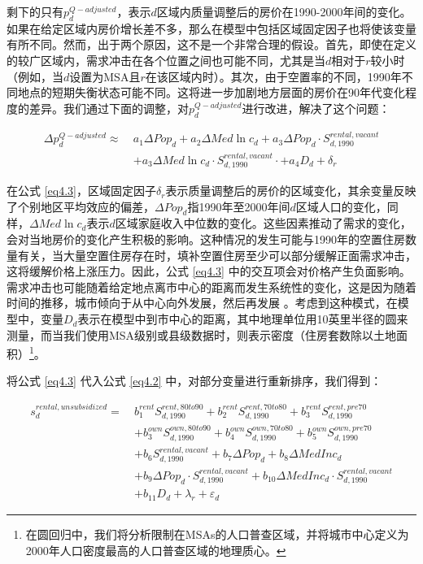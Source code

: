 \documentclass[lang=cn,11pt,a4paper]{paper}
\begin{document}
剩下的只有$p_{d}^{Q-adjusted}$，表示$d$区域内质量调整后的房价在1990-2000年间的变化。如果在给定区域内房价增长差不多，那么在模型中包括区域固定因子也将使该变量有所不同。然而，出于两个原因，这不是一个非常合理的假设。首先，即使在定义的较广区域内，需求冲击在各个位置之间也可能不同，尤其是当$d$相对于$r$较小时（例如，当$d$设置为MSA且$r$在该区域内时）。其次，由于空置率的不同，1990年不同地点的短期失衡状态可能不同。这将进一步加剧地方层面的房价在90年代变化程度的差异。我们通过下面的调整，对$p_{d}^{Q-adjusted}$进行改进，解决了这个问题：

\begin{equation}\label{eq4.3}
  \begin{aligned}
    \Delta p_{d}^{Q-adjusted} \approx \ & a_{1} \Delta Pop_{d}+a_{2} \Delta Med \ln c_{d}+a_{3} \Delta P o p_{d} \cdot S_{d, 1990}^{rental,vacant} \\
    &+a_{3} \Delta M e d \ln c_{d} \cdot S_{d, 1990}^{rental,vacant} \cdot+a_{4} D_{d}+\delta_{r}
    \end{aligned}
\end{equation}
\vspace{2pt}

在公式 \eqref{eq4.3}，区域固定因子$\delta_{r}$表示质量调整后的房价的区域变化，其余变量反映了个别地区平均效应的偏差，$\Delta Pop_{d}$指1990年至2000年间$d$区域人口的变化，同样，$\Delta Med \ln c_{d}$表示$d$区域家庭收入中位数的变化。这些因素推动了需求的变化，会对当地房价的变化产生积极的影响。这种情况的发生可能与1990年的空置住房数量有关，当大量空置住房存在时，填补空置住房至少可以部分缓解正面需求冲击，这将缓解价格上涨压力。因此，公式 \eqref{eq4.3} 中的交互项会对价格产生负面影响。需求冲击也可能随着给定地点离市中心的距离而发生系统性的变化，这是因为随着时间的推移，城市倾向于从中心向外发展，然后再发展 \citep{Brueckner2009725}。考虑到这种模式，在模型中，变量$D_d$表示在模型中到市中心的距离，其中地理单位用10英里半径的圆来测量，而当我们使用MSA级别或县级数据时，则表示密度（住房套数除以土地面积）\!\footnote{在圆回归中，我们将分析限制在MSAs的人口普查区域，并将城市中心定义为2000年人口密度最高的人口普查区域的地理质心。}。

将公式 \eqref{eq4.3} 代入公式 \eqref{eq4.2} 中，对部分变量进行重新排序，我们得到：

\begin{equation}\label{eq4.4}
  \begin{aligned}
    s_{d}^{rental, unsubsidized}=\ & b_{1}^{rent} S_{d, 1990}^{rent, 80 t o 90}+b_{2}^{rent} S_{d, 1990}^{rent, 70 t o 80}+b_{3}^{rent} S_{d, 1990}^{rent, p r e 70} \\
    &+b_{3}^{own} S_{d, 1990}^{own, 80 t o 90}+b_{4}^{own} S_{d, 1990}^{own, 70 t o 80}+b_{5}^{own} S_{d, 1990}^{own, p r e 70} \\
    &+b_{6} S_{d, 1990}^{rent a l, vacant}+b_{7} \Delta P o p_{d}+b_{8} \Delta MedInc_{d} \\
    &+b_{9} \Delta Po p_{d} \cdot S_{d, 1990}^{rental, vacant}+b_{10} \Delta MedInc_{d} \cdot S_{d, 1990}^{rent a l, vacant} \\
    &+b_{11} D_{d}+\lambda_{r}+\varepsilon_{d}
    \end{aligned}
\end{equation}
\vspace{2pt}
\end{document}
